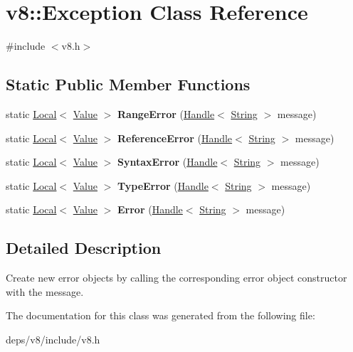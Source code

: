 \hypertarget{classv8_1_1_exception}{}\section{v8\+:\+:Exception Class Reference}
\label{classv8_1_1_exception}


{\ttfamily \#include $<$v8.\+h$>$}

\subsection*{Static Public Member Functions}
\begin{DoxyCompactItemize}
\item 
\hypertarget{classv8_1_1_exception_a3ce2406b4aa50f8639450ec11baee26f}{}static \hyperlink{classv8_1_1_local}{Local}$<$ \hyperlink{classv8_1_1_value}{Value} $>$ {\bfseries Range\+Error} (\hyperlink{classv8_1_1_handle}{Handle}$<$ \hyperlink{classv8_1_1_string}{String} $>$ message)\label{classv8_1_1_exception_a3ce2406b4aa50f8639450ec11baee26f}

\item 
\hypertarget{classv8_1_1_exception_adef7d49c3370594fbc97ee68c3fcbf29}{}static \hyperlink{classv8_1_1_local}{Local}$<$ \hyperlink{classv8_1_1_value}{Value} $>$ {\bfseries Reference\+Error} (\hyperlink{classv8_1_1_handle}{Handle}$<$ \hyperlink{classv8_1_1_string}{String} $>$ message)\label{classv8_1_1_exception_adef7d49c3370594fbc97ee68c3fcbf29}

\item 
\hypertarget{classv8_1_1_exception_a938d1b571e9021121ad0f820c5e95114}{}static \hyperlink{classv8_1_1_local}{Local}$<$ \hyperlink{classv8_1_1_value}{Value} $>$ {\bfseries Syntax\+Error} (\hyperlink{classv8_1_1_handle}{Handle}$<$ \hyperlink{classv8_1_1_string}{String} $>$ message)\label{classv8_1_1_exception_a938d1b571e9021121ad0f820c5e95114}

\item 
\hypertarget{classv8_1_1_exception_a61645d9d6b46cf76f2a8eccfe7039b90}{}static \hyperlink{classv8_1_1_local}{Local}$<$ \hyperlink{classv8_1_1_value}{Value} $>$ {\bfseries Type\+Error} (\hyperlink{classv8_1_1_handle}{Handle}$<$ \hyperlink{classv8_1_1_string}{String} $>$ message)\label{classv8_1_1_exception_a61645d9d6b46cf76f2a8eccfe7039b90}

\item 
\hypertarget{classv8_1_1_exception_ae598e4b24cf37c9986b6ad1bed858aee}{}static \hyperlink{classv8_1_1_local}{Local}$<$ \hyperlink{classv8_1_1_value}{Value} $>$ {\bfseries Error} (\hyperlink{classv8_1_1_handle}{Handle}$<$ \hyperlink{classv8_1_1_string}{String} $>$ message)\label{classv8_1_1_exception_ae598e4b24cf37c9986b6ad1bed858aee}

\end{DoxyCompactItemize}


\subsection{Detailed Description}
Create new error objects by calling the corresponding error object constructor with the message. 

The documentation for this class was generated from the following file\+:\begin{DoxyCompactItemize}
\item 
deps/v8/include/v8.\+h\end{DoxyCompactItemize}
